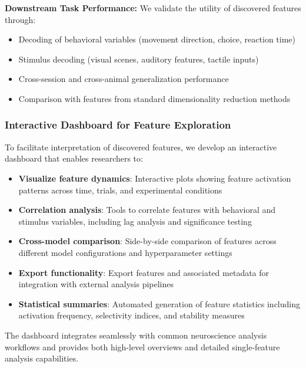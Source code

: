 \textbf{Downstream Task Performance:}
We validate the utility of discovered features through:
\begin{itemize}
\item Decoding of behavioral variables (movement direction, choice, reaction time)
\item Stimulus decoding (visual scenes, auditory features, tactile inputs)
\item Cross-session and cross-animal generalization performance
\item Comparison with features from standard dimensionality reduction methods
\end{itemize}

\subsubsection{Interactive Dashboard for Feature Exploration}

To facilitate interpretation of discovered features, we develop an interactive dashboard that enables researchers to:

\begin{itemize}
\item \textbf{Visualize feature dynamics}: Interactive plots showing feature activation patterns across time, trials, and experimental conditions
\item \textbf{Correlation analysis}: Tools to correlate features with behavioral and stimulus variables, including lag analysis and significance testing
\item \textbf{Cross-model comparison}: Side-by-side comparison of features across different model configurations and hyperparameter settings
\item \textbf{Export functionality}: Export features and associated metadata for integration with external analysis pipelines
\item \textbf{Statistical summaries}: Automated generation of feature statistics including activation frequency, selectivity indices, and stability measures
\end{itemize}

The dashboard integrates seamlessly with common neuroscience analysis workflows and provides both high-level overviews and detailed single-feature analysis capabilities.
